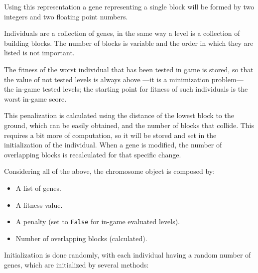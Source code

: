 \documentclass[a4paper,twoside]{article}
\begin{document}
Using this representation a gene representing a single block will be formed by two integers and two floating point numbers.

Individuals are a collection of genes, in the same way a level is a collection 
of building blocks. The number of blocks is variable and the order in which 
they are listed is not important. 

The fitness of the worst individual that has been tested in game is
stored, so that the value of not tested levels is always above ---it is a minimization problem--- the in-game 
tested levels; the starting point for fitness of such individuals is the 
worst in-game score.

This penalization is calculated using the distance of the lowest block to the 
ground, which can be easily obtained, and the number of blocks that collide. 
This requires a bit more of computation, so it will be stored and set in the 
initialization of the individual. When a gene is modified, the number of 
overlapping blocks is recalculated for that specific change.

Considering all of the above, the chromosome object is composed by:
\begin{itemize}
	\item A list of genes.
	\item A fitness value.
	\item A penalty (set to {\tt False} for in-game evaluated levels).
	\item Number of overlapping blocks (calculated).
\end{itemize} %


Initialization is done randomly, with each individual having a random number of 
genes, which are initialized by several methods: 
\end{document}
